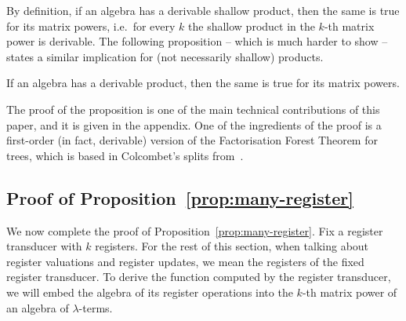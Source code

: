 By definition, if an algebra has a derivable shallow product, then the same is true for its  matrix powers, i.e.~for every $k$ the shallow product in the $k$-th matrix power is derivable. The following proposition -- which is much harder to show -- states a similar implication for  (not necessarily shallow) products.  
\begin{proposition}\label{prop:matrix-power} If an algebra has a derivable product, then the same is true for its matrix powers.
\end{proposition}
The proof of the  proposition is one of the main technical contributions of this paper, and it is given in the appendix. One of the ingredients of the proof is a first-order (in fact, derivable) version of the Factorisation Forest Theorem for trees, which is based in Colcombet's splits from~\cite{colcombetCombinatorialTheoremTrees2007}.  


\newcommand{\nmax}{n_{\mathrm{max}}}
\subsection{Proof of Proposition~\ref{prop:many-register}}
\label{sec:proof-of-prop}
We now complete the proof of Proposition~\ref{prop:many-register}. 
Fix a register transducer with $k$ registers. For the rest of this section, when talking about register valuations and register updates, we mean the registers of the fixed register transducer. To derive the function computed by the register transducer, we will embed the algebra of its register operations into the $k$-th matrix power of an algebra of $\lambda$-terms.  

